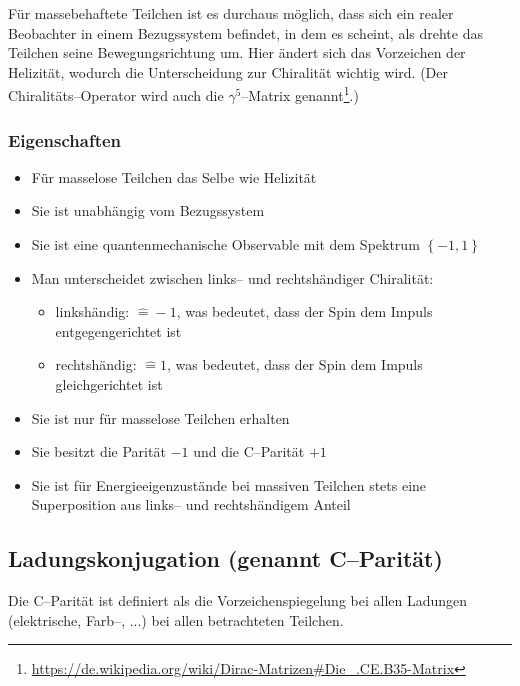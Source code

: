 \documentclass[Ex4_Zusammenfassung.tex]{subfiles}
\begin{document}
Für massebehaftete Teilchen ist es durchaus möglich, dass sich ein realer Beobachter in einem Bezugssystem befindet, in dem es scheint, als drehte das Teilchen seine Bewegungsrichtung um. Hier ändert sich das Vorzeichen der Helizität, wodurch die Unterscheidung zur Chiralität wichtig wird. (Der Chiralitäts--Operator wird auch die $\gamma^5$--Matrix genannt\footnote{\href{https://de.wikipedia.org/wiki/Dirac-Matrizen\#Die\_.CE.B35-Matrix}{https://de.wikipedia.org/wiki/Dirac-Matrizen\#Die\_.CE.B35-Matrix}}.)

\subsubsection{Eigenschaften}
\begin{itemize}
	\item Für masselose Teilchen das Selbe wie Helizität
	\item Sie ist unabhängig vom Bezugssystem
	\item Sie ist eine quantenmechanische Observable mit dem Spektrum $\left\{ -1, 1\right\}$
	\item Man unterscheidet zwischen links-- und rechtshändiger Chiralität: 
		\begin{itemize}
			\item linkshändig: $\hat{=} -1$, was bedeutet, dass der Spin dem Impuls entgegengerichtet ist
			\item rechtshändig: $\hat{=} 1$, was bedeutet, dass der Spin dem Impuls gleichgerichtet ist
		\end{itemize}
	\item Sie ist nur für masselose Teilchen erhalten
	\item Sie besitzt die Parität $-1$ und die C--Parität $+1$
	\item Sie ist für Energieeigenzustände bei massiven Teilchen stets eine Superposition aus links-- und rechtshändigem Anteil
\end{itemize}


\subsection{Ladungskonjugation (genannt C--Parität)}
Die C--Parität ist definiert als die Vorzeichenspiegelung bei allen Ladungen (elektrische, Farb--, ...) bei allen betrachteten Teilchen. 
\end{document}
